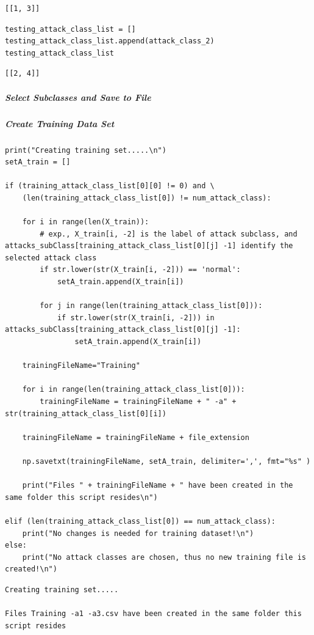 \begin{verbatim}
[[1, 3]]
\end{verbatim}

\begin{verbatim}
testing_attack_class_list = []
testing_attack_class_list.append(attack_class_2)
testing_attack_class_list
\end{verbatim}

\begin{verbatim}
[[2, 4]]
\end{verbatim}

\subparagraph{Select Subclasses and Save to File}

\subparagraph{Create Training Data Set}

\begin{verbatim}
print("Creating training set.....\n")
setA_train = []

if (training_attack_class_list[0][0] != 0) and \
    (len(training_attack_class_list[0]) != num_attack_class):

    for i in range(len(X_train)):
        # exp., X_train[i, -2] is the label of attack subclass, and attacks_subClass[training_attack_class_list[0][j] -1] identify the selected attack class
        if str.lower(str(X_train[i, -2])) == 'normal':
            setA_train.append(X_train[i])

        for j in range(len(training_attack_class_list[0])):
            if str.lower(str(X_train[i, -2])) in attacks_subClass[training_attack_class_list[0][j] -1]:
                setA_train.append(X_train[i])

    trainingFileName="Training"

    for i in range(len(training_attack_class_list[0])):
        trainingFileName = trainingFileName + " -a" + str(training_attack_class_list[0][i])

    trainingFileName = trainingFileName + file_extension

    np.savetxt(trainingFileName, setA_train, delimiter=',', fmt="%s" )

    print("Files " + trainingFileName + " have been created in the same folder this script resides\n")

elif (len(training_attack_class_list[0]) == num_attack_class):
    print("No changes is needed for training dataset!\n")
else:
    print("No attack classes are chosen, thus no new training file is created!\n")
\end{verbatim}

\begin{verbatim}
Creating training set.....

Files Training -a1 -a3.csv have been created in the same folder this script resides
\end{verbatim}

